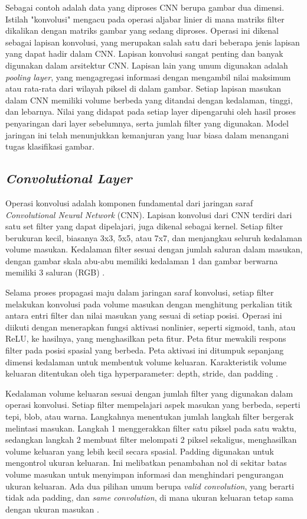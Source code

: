 Sebagai contoh adalah data yang diproses CNN berupa gambar dua dimensi. Istilah "konvolusi" mengacu pada operasi aljabar linier di mana matriks filter dikalikan dengan matriks gambar yang sedang diproses. Operasi ini dikenal sebagai lapisan konvolusi, yang merupakan salah satu dari beberapa jenis lapisan yang dapat hadir dalam CNN. Lapisan konvolusi sangat penting dan banyak digunakan dalam arsitektur CNN. Lapisan lain yang umum digunakan adalah \emph{pooling layer}, yang mengagregasi informasi dengan mengambil nilai maksimum atau rata-rata dari wilayah piksel di dalam gambar. Setiap lapisan masukan dalam CNN memiliki volume berbeda yang ditandai dengan kedalaman, tinggi, dan lebarnya. Nilai yang didapat pada setiap layer dipengaruhi oleh hasil proses penyaringan dari layer sebelumnya, serta jumlah filter yang digunakan. Model jaringan ini telah menunjukkan kemanjuran yang luar biasa dalam menangani tugas klasifikasi gambar.

\subsection{\emph{Convolutional Layer}}
\label{subsec:cnn}

Operasi konvolusi adalah komponen fundamental dari jaringan saraf \emph{Convolutional Neural Network} (CNN). Lapisan konvolusi dari CNN terdiri dari satu set filter yang dapat dipelajari, juga dikenal sebagai kernel. Setiap filter berukuran kecil, biasanya 3x3, 5x5, atau 7x7, dan menjangkau seluruh kedalaman volume masukan. Kedalaman filter sesuai dengan jumlah saluran dalam masukan, dengan gambar skala abu-abu memiliki kedalaman 1 dan gambar berwarna memiliki 3 saluran (RGB) \parencite{Bezdan}. 

Selama proses propagasi maju dalam jaringan saraf konvolusi, setiap filter melakukan konvolusi pada volume masukan dengan menghitung perkalian titik antara entri filter dan nilai masukan yang sesuai di setiap posisi. Operasi ini diikuti dengan menerapkan fungsi aktivasi nonlinier, seperti sigmoid, tanh, atau ReLU, ke hasilnya, yang menghasilkan peta fitur. Peta fitur mewakili respons filter pada posisi spasial yang berbeda. Peta aktivasi ini ditumpuk sepanjang dimensi kedalaman untuk membentuk volume keluaran. Karakteristik volume keluaran ditentukan oleh tiga hyperparameter: depth, stride, dan padding \parencite{Bezdan}.

Kedalaman volume keluaran sesuai dengan jumlah filter yang digunakan dalam operasi konvolusi. Setiap filter mempelajari aspek masukan yang berbeda, seperti tepi, blob, atau warna. Langkahnya menentukan jumlah langkah filter bergerak melintasi masukan. Langkah 1 menggerakkan filter satu piksel pada satu waktu, sedangkan langkah 2 membuat filter melompati 2 piksel sekaligus, menghasilkan volume keluaran yang lebih kecil secara spasial. Padding digunakan untuk mengontrol ukuran keluaran. Ini melibatkan penambahan nol di sekitar batas volume masukan untuk menyimpan informasi dan menghindari pengurangan ukuran keluaran. Ada dua pilihan umum berupa \emph{valid convolution}, yang berarti tidak ada padding, dan \emph{same convolution}, di mana ukuran keluaran tetap sama dengan ukuran masukan \parencite{Bezdan}.

